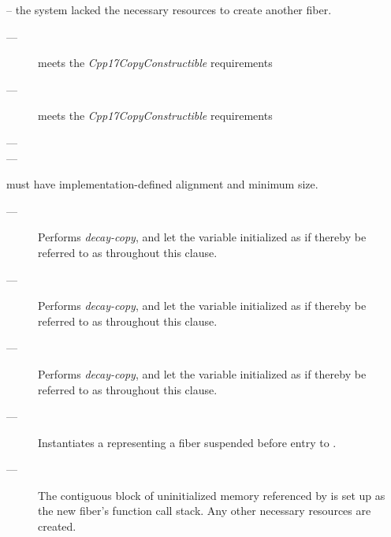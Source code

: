 \errors
{} -- the system lacked the necessary resources to create another fiber.


\mandates
\begin{description}
    \item[---]  meets the \emph{Cpp17CopyConstructible} requirements
    \item[---]  meets the \emph{Cpp17CopyConstructible} requirements
    \item[---] 
    \item[---] 
\end{description}

\precond
{} must have implementation-defined alignment and minimum size.

\effects
\begin{description}
    \item[---] Performs \emph{decay-copy}, and let the variable initialized as if thereby be referred to as  throughout this clause.
    \item[---] Performs \emph{decay-copy}, and let the variable initialized as if thereby be referred to as  throughout this clause.
    \item[---] Performs \emph{decay-copy}, and let the variable initialized as if thereby be referred to as  throughout this clause.
    \item[---] Instantiates a \fiber representing a fiber suspended before
              entry to .
    \item[---] The contiguous block of uninitialized memory referenced
              by  is set up as the new fiber's function call stack.
              Any other necessary resources are created.
\end{description}

